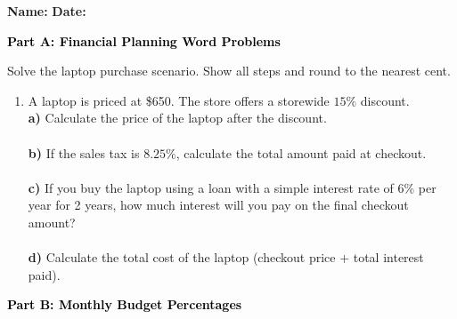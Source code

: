 \documentclass[12pt, letterpaper, fleqn]{article}
\newcommand{\blanklong}{\underline{\hspace{6.5cm}}}
\begin{document}
\textbf{Name:} \underline{\hspace{5cm}}
\hfill
\textbf{Date:} \underline{\hspace{3cm}}\\

\begin{tcolorbox}[colback=black!10]
    \large\textcolor{black}{\textbf{Part A: Financial Planning Word Problems}}
\end{tcolorbox}

\vspace{3mm}

\noindent
Solve the laptop purchase scenario. Show all steps and round to the nearest cent.

\vspace{5mm}

\begin{enumerate}[itemsep=2.2cm, leftmargin=0.6cm]
\item A laptop is priced at \$650. The store offers a storewide $15\%$ discount. \\
\textbf{a)} Calculate the price of the laptop after the discount. \\
\blanklong \\
\textbf{b)} If the sales tax is $8.25\%$, calculate the total amount paid at checkout. \\
\blanklong \\
\textbf{c)} If you buy the laptop using a loan with a simple interest rate of $6\%$ per year for 2 years, how much interest will you pay on the final checkout amount? \\
\blanklong \\
\textbf{d)} Calculate the total cost of the laptop (checkout price + total interest paid). \\
\blanklong
\end{enumerate}

\newpage

\begin{tcolorbox}[colback=black!10]
    \large\textcolor{black}{\textbf{Part B: Monthly Budget Percentages}}
\end{tcolorbox}

\vspace{3mm}
\end{document}
